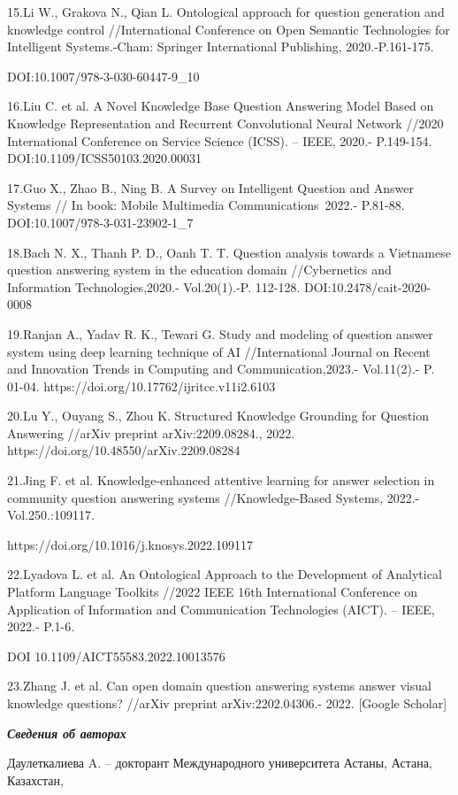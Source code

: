 15.Li W., Grakova N., Qian L. Ontological approach for question
generation and knowledge control //International Conference on Open
Semantic Technologies for Intelligent Systems.-Cham: Springer
International Publishing, 2020.-P.161-175.

DOI:10.1007/978-3-030-60447-9\_10

16.Liu C. et al. A Novel Knowledge Base Question Answering Model Based
on Knowledge Representation and Recurrent Convolutional Neural Network
//2020 International Conference on Service Science (ICSS). -- IEEE,
2020.- P.149-154. DOI:10.1109/ICSS50103.2020.00031

17.Guo X., Zhao B., Ning B. A Survey on Intelligent Question and Answer
Systems // In book: Mobile Multimedia Communications~2022.- P.81-88.
DOI:10.1007/978-3-031-23902-1\_7

18.Bach N. X., Thanh P. D., Oanh T. T. Question analysis towards a
Vietnamese question answering system in the education domain
//Cybernetics and Information Technologies,2020.- Vol.20(1).-P. 112-128.
DOI:10.2478/cait-2020-0008

19.Ranjan A., Yadav R. K., Tewari G. Study and modeling of question
answer system using deep learning technique of AI //International
Journal on Recent and Innovation Trends in Computing and
Communication,2023.- Vol.11(2).- P. 01-04.
https://doi.org/10.17762/ijritcc.v11i2.6103

20.Lu Y., Ouyang S., Zhou K. Structured Knowledge Grounding for Question
Answering //arXiv preprint arXiv:2209.08284., 2022.
https://doi.org/10.48550/arXiv.2209.08284

21.Jing F. et al. Knowledge-enhanced attentive learning for answer
selection in community question answering systems //Knowledge-Based
Systems, 2022.- Vol.250.:109117.

https://doi.org/10.1016/j.knosys.2022.109117

22.Lyadova L. et al. An Ontological Approach to the Development of
Analytical Platform Language Toolkits //2022 IEEE 16th International
Conference on Application of Information and Communication Technologies
(AICT). -- IEEE, 2022.- P.1-6.

DOI 10.1109/AICT55583.2022.10013576

23.Zhang J. et al. Can open domain question answering systems answer
visual knowledge questions? //arXiv preprint arXiv:2202.04306.- 2022.
{[}Google Scholar{]}

\emph{\textbf{Сведения об авторах}}

Даулеткалиева A. -- докторант Международного университета Астаны,
Астана, Казахстан,

